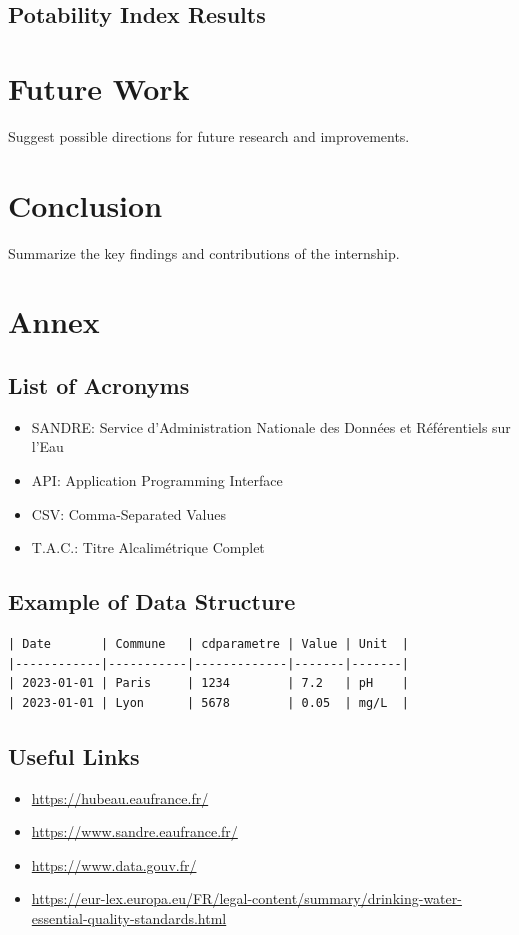 \documentclass{article}
\begin{document}
\subsection{Potability Index Results}


\section{Future Work}
Suggest possible directions for future research and improvements.

\section{Conclusion}
Summarize the key findings and contributions of the internship.

\appendix
\section{Annex}

\subsection{List of Acronyms}
\begin{itemize}
    \item SANDRE: Service d’Administration Nationale des Données et Référentiels sur l’Eau
    \item API: Application Programming Interface
    \item CSV: Comma-Separated Values
    \item T.A.C.: Titre Alcalimétrique Complet
\end{itemize}

\subsection{Example of Data Structure}
\begin{verbatim}
| Date       | Commune   | cdparametre | Value | Unit  |
|------------|-----------|-------------|-------|-------|
| 2023-01-01 | Paris     | 1234        | 7.2   | pH    |
| 2023-01-01 | Lyon      | 5678        | 0.05  | mg/L  |
\end{verbatim}

\subsection{Useful Links}
\begin{itemize}
    \item \url{https://hubeau.eaufrance.fr/}
    \item \url{https://www.sandre.eaufrance.fr/}
    \item \url{https://www.data.gouv.fr/}
    \item \url{https://eur-lex.europa.eu/FR/legal-content/summary/drinking-water-essential-quality-standards.html}
\end{itemize}
\end{document}
